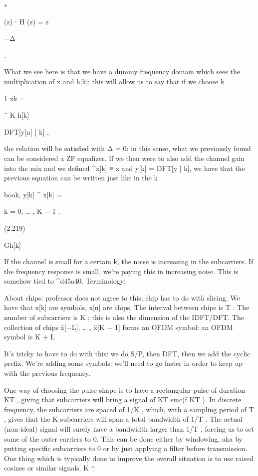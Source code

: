 {{{∗

(z) ⋅ H (z) = z

−Δ

.

What we see here is that we have a dummy frequency domain which sees the multiplication of x and h̄[k]: this will allow us to say that if we choose k

1 xk =

¯
K h[k]

DFT[y[n] | k] ,

the relation will be satisfied with Δ = 0: in this sense, what we previously found can be considered a ZF equalizer.
If we then were to also add the channel gain \sqrtG into the mix and we defined ^x[k] ≡ x and y[k] = DFT[y | k], we have that the previous equation can be written just like in the k

book,
y[k]
^
x[k] =

k = 0, … , K − 1 .

(2.219)

\sqrt Gh[k]

If the channel is small for a certain k, the noise is increasing in the subcarriers. If the frequency response is small, we're paying this in increasing noise.
This is somehow tied to ^d45a40.
Terminology:

About chips: professor does not agree to this; chip has to do with slicing.
We have that x[k] are symbols, x[n] are chips.
The interval between chips is T .
The number of subcarriers is K ; this is also the dimension of the IDFT/DFT.
The collection of chips x̄[−L], … , x̄[K − 1] forms an OFDM symbol: an OFDM symbol is K + L

It's tricky to have to do with this: we do S/P, then DFT, then we add the cyclic prefix.
We're adding some symbols: we'll need to go faster in order to keep up with the previous frequency.

One way of choosing the pulse shape is to have a rectangular pulse of duration KT ,
giving that subcarriers will bring a signal of KT sinc(f KT ).
In discrete frequency, the subcarriers are spaced of 1/K , which, with a sampling period of T , gives that the K subcarriers will span a total bandwidth of 1/T .
The actual (non-ideal) signal will surely have a bandwidth larger than 1/T , forcing us to set some of the outer carriers to 0.
This can be done either by windowing, aka by putting specific subcarriers to 0 or by just applying a filter before transmission.
One thing which is typically done to improve the overall situation is to use raised cosines or similar signals.
K ↑

}}}
